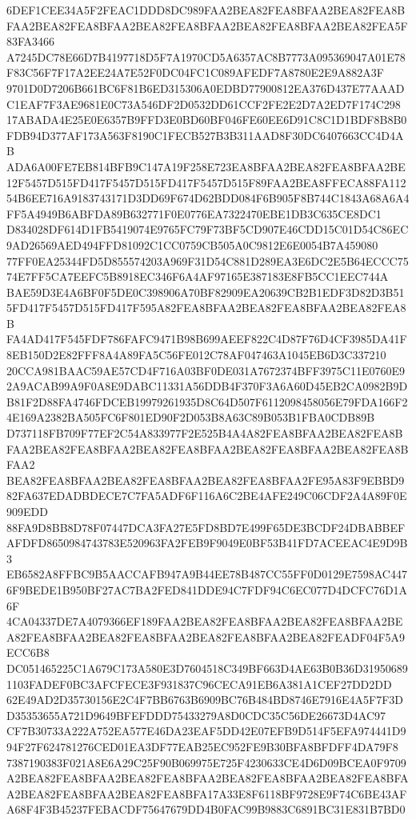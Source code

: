 \documentclass[UTF8,fontset=fandol,zihao=-4,a4paper]{ctexart}
\begin{document}
{{6DEF1CEE34A5F2FEAC1DDD8DC989FAA2BEA82FEA8BFAA2BEA82FEA8BFAA2BEA82FEA8BFAA2BEA82FEA8BFAA2BEA82FEA8BFAA2BEA82FEA5F83FA3466
A7245DC78E66D7B4197718D5F7A1970CD5A6357AC8B7773A095369047A01E78F83C56F7F17A2EE24A7E52F0DC04FC1C089AFEDF7A8780E2E9A882A3F
9701D0D7206B661BC6F81B6ED315306A0EDBD77900812EA376D437E77AAADC1EAF7F3AE9681E0C73A546DF2D0532DD61CCF2FE2E2D7A2ED7F174C298
17ABADA4E25E0E6357B9FFD3E0BD60BF046FE60EE6D91C8C1D1BDF8B8B0FDB94D377AF173A563F8190C1FECB527B3B311AAD8F30DC6407663CC4D4AB
ADA6A00FE7EB814BFB9C147A19F258E723EA8BFAA2BEA82FEA8BFAA2BE12F5457D515FD417F5457D515FD417F5457D515F89FAA2BEA8FFECA88FA112
54B6EE716A9183743171D3DD69F674D62BDD084F6B905F8B744C1843A68A6A4FF5A4949B6ABFDA89B632771F0E0776EA7322470EBE1DB3C635CE8DC1
D834028DF614D1FB5419074E9765FC79F73BF5CD907E46CDD15C01D54C86EC9AD26569AED494FFD81092C1CC0759CB505A0C9812E6E0054B7A459080
77FF0EA25344FD5D855574203A969F31D54C881D289EA3E6DC2E5B64ECCC7574E7FF5CA7EEFC5B8918EC346F6A4AF97165E387183E8FB5CC1EEC744A
BAE59D3E4A6BF0F5DE0C398906A70BF82909EA20639CB2B1EDF3D82D3B515FD417F5457D515FD417F595A82FEA8BFAA2BEA82FEA8BFAA2BEA82FEA8B
FA4AD417F545FDF786FAFC9471B98B699AEEF822C4D87F76D4CF3985DA41F8EB150D2E82FFF8A4A89FA5C56FE012C78AF047463A1045EB6D3C337210
20CCA981BAAC59AE57CD4F716A03BF0DE031A7672374BFF3975C11E0760E92A9ACAB99A9F0A8E9DABC11331A56DDB4F370F3A6A60D45EB2CA0982B9D
B81F2D88FA4746FDCEB19979261935D8C64D507F6112098458056E79FDA166F24E169A2382BA505FC6F801ED90F2D053B8A63C89B053B1FBA0CDB89B
D737118FB709F77EF2C54A833977F2E525B4A4A82FEA8BFAA2BEA82FEA8BFAA2BEA82FEA8BFAA2BEA82FEA8BFAA2BEA82FEA8BFAA2BEA82FEA8BFAA2
BEA82FEA8BFAA2BEA82FEA8BFAA2BEA82FEA8BFAA2FE95A83F9EBBD982FA637EDADBDECE7C7FA5ADF6F116A6C2BE4AFE249C06CDF2A4A89F0E909EDD
88FA9D8BB8D78F07447DCA3FA27E5FD8BD7E499F65DE3BCDF24DBABBEFAFDFD8650984743783E520963FA2FEB9F9049E0BF53B41FD7ACEEAC4E9D9B3
EB6582A8FFBC9B5AACCAFB947A9B44EE78B487CC55FF0D0129E7598AC4476F9BEDE1B950BF27AC7BA2FED841DDE94C7FDF94C6EC077D4DCFC76D1A6F
4CA04337DE7A4079366EF189FAA2BEA82FEA8BFAA2BEA82FEA8BFAA2BEA82FEA8BFAA2BEA82FEA8BFAA2BEA82FEA8BFAA2BEA82FEADF04F5A9ECC6B8
DC051465225C1A679C173A580E3D7604518C349BF663D4AE63B0B36D319506891103FADEF0BC3AFCFECE3F931837C96CECA91EB6A381A1CEF27DD2DD
62E49AD2D35730156E2C4F7BB6763B6909BC76B484BD8746E7916E4A5F7F3DD35353655A721D9649BFEFDDD75433279A8D0CDC35C56DE26673D4AC97
CF7B30733A222A752EA577E46DA23EAF5DD42E07EFB9D514F5EFA974441D994F27F624781276CED01EA3DF77EAB25EC952FE9B30BFA8BFDFF4DA79F8
7387190383F021A8E6A29C25F90B069975E725F4230633CE4D6D09BCEA0F9709A2BEA82FEA8BFAA2BEA82FEA8BFAA2BEA82FEA8BFAA2BEA82FEA8BFA
A2BEA82FEA8BFAA2BEA82FEA8BFA17A33E8F6118BF9728E9F74C6BE43AFA68F4F3B45237FEBACDF75647679DD4B0FAC99B9883C6891BC31E831B7BD0
}}
\end{document}
